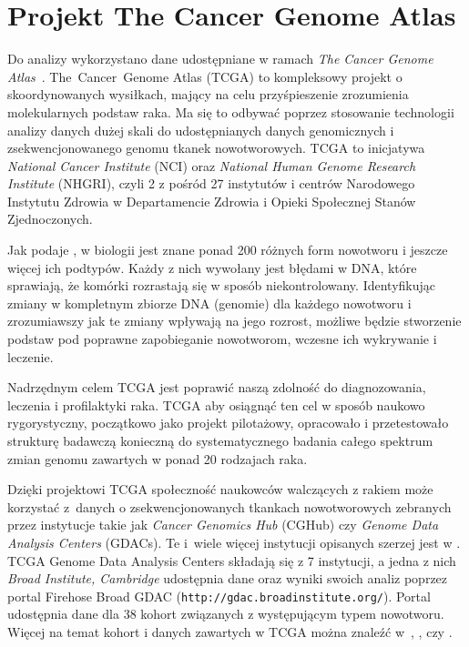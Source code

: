 \section{Projekt The Cancer Genome Atlas}

Do analizy wykorzystano dane udostępniane w ramach \textit{The Cancer Genome Atlas}~\cite{broad}. The~Cancer~Genome Atlas (TCGA) to kompleksowy projekt o skoordynowanych wysiłkach, mający na celu przyśpieszenie zrozumienia molekularnych podstaw raka. Ma się to odbywać poprzez stosowanie technologii analizy danych dużej skali do udostępnianych danych genomicznych i zsekwencjonowanego genomu tkanek nowotworowych. TCGA to inicjatywa \textit{National Cancer Institute} (NCI) oraz \textit{National Human Genome Research Institute} (NHGRI), czyli 2 z pośród 27 instytutów i centrów Narodowego Instytutu Zdrowia w Departamencie Zdrowia i Opieki Społecznej Stanów Zjednoczonych.

Jak podaje \cite{patrycja}, w biologii jest znane ponad 200 różnych form nowotworu i jeszcze więcej ich podtypów. Każdy z nich wywołany jest błędami w DNA, które sprawiają, że komórki rozrastają się w sposób niekontrolowany. Identyfikując zmiany w kompletnym zbiorze DNA (genomie) dla każdego nowotworu i zrozumiawszy jak te zmiany wpływają na jego rozrost, możliwe będzie stworzenie podstaw pod poprawne zapobieganie nowotworom, wczesne ich wykrywanie i leczenie. 

Nadrzędnym celem TCGA jest poprawić naszą zdolność do diagnozowania, leczenia i profilaktyki raka. TCGA aby osiągnąć ten cel w sposób naukowo rygorystyczny, początkowo jako projekt pilotażowy, opracowało i przetestowało strukturę badawczą konieczną do systematycznego badania całego spektrum zmian genomu zawartych w ponad 20 rodzajach raka.

Dzięki projektowi TCGA społeczność naukowców walczących z rakiem może korzystać z~danych o zsekwencjonowanych tkankach nowotworowych zebranych przez instytucje takie jak \textit{Cancer Genomics Hub} (CGHub) czy \textit{Genome Data Analysis Centers} (GDACs). Te i~wiele więcej instytucji opisanych szerzej jest w \cite{patrycja}. TCGA Genome Data Analysis Centers składają się z 7 instytucji, a jedna z nich \textit{Broad Institute, Cambridge} udostępnia dane oraz wyniki swoich analiz poprzez portal Firehose Broad GDAC (\texttt{http://gdac.broadinstitute.org/}). Portal udostępnia dane dla 38 kohort związanych z występującym typem nowotworu. Więcej na temat kohort i danych zawartych w TCGA można znaleźć w~\cite{chin1}, \cite{chin2}, \cite{future} czy \cite{patrycja}. 

